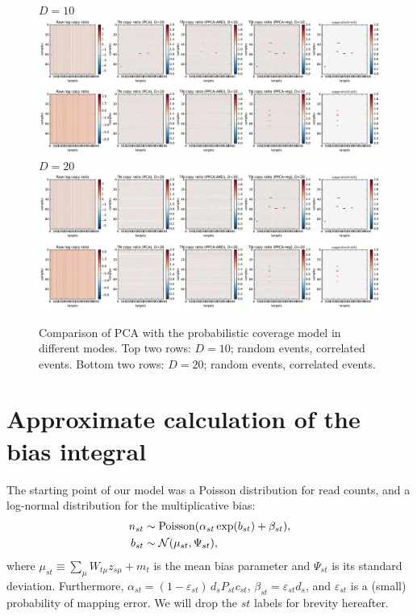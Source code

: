 \documentclass[nofootinbib,amssymb,amsmath]{revtex4}
\newcommand{\norm}{{\mathcal N}}
\newcommand{\pois}{{\rm Poisson}}
\newcommand{\epss}{\varepsilon}
\begin{document}
\begin{figure}
\center
$D=10$\\
\vspace{10pt}
\includegraphics[scale=0.45]{figures/comp_random_events_10_compressed.pdf}
\vspace{20pt}
\includegraphics[scale=0.45]{figures/comp_corr_events_10_compressed.pdf}
$D=20$\\
\vspace{10pt}
\includegraphics[scale=0.45]{figures/comp_random_events_20_compressed.pdf}
\includegraphics[scale=0.45]{figures/comp_corr_events_20_compressed.pdf}
\caption{Comparison of PCA with the probabilistic coverage model in different modes. Top two rows: $D=10$; random events, correlated events. Bottom two rows: $D=20$; random events, correlated events.}
\label{fig:comp_regularizer}
\end{figure}


\appendix

\section{Approximate calculation of the bias integral}
The starting point of our model was a Poisson distribution for read counts, and a log-normal distribution for the multiplicative bias:
\begin{align}
n_{st} &\sim \pois(\alpha_{st}\exp(b_{st}) + \beta_{st}),\nonumber\\
b_{st} &\sim \norm(\mu_{st}, \Psi_{st}),
\end{align}
where $\mu_{st} \equiv \sum_\mu W_{t\mu} z_{s\mu} + m_t$ is the mean bias parameter and $\Psi_{st}$ is its standard deviation. Furthermore, $\alpha_{st} = (1-\epss_{st})\,d_s P_{st} c_{st}$, $\beta_{st} = \epss_{st} d_s$, and $\epss_{st}$ is a (small) probability of mapping error. We will drop the $st$ labels for brevity hereafter.
\end{document}
